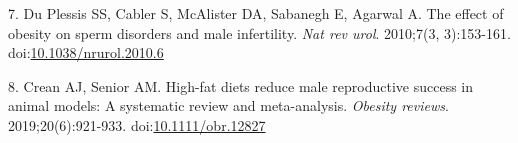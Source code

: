\documentclass[11pt]{article}
\begin{document}
\hypertarget{citeproc_bib_item_7}{7. Du Plessis SS, Cabler S, McAlister DA, Sabanegh E, Agarwal A. The effect of obesity on sperm disorders and male infertility. \textit{Nat rev urol}. 2010;7(3, 3):153-161. doi:\href{https://doi.org/10.1038/nrurol.2010.6}{10.1038/nrurol.2010.6}}

\hypertarget{citeproc_bib_item_8}{8. Crean AJ, Senior AM. High-fat diets reduce male reproductive success in animal models: A systematic review and meta-analysis. \textit{Obesity reviews}. 2019;20(6):921-933. doi:\href{https://doi.org/10.1111/obr.12827}{10.1111/obr.12827}}
\end{document}
